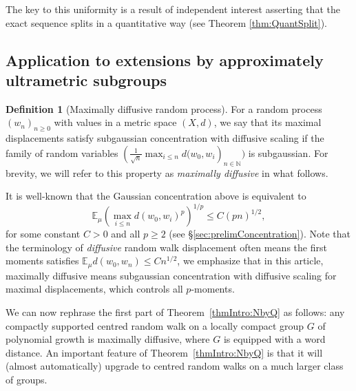 \documentclass[11pt,leqno]{article}
\theoremstyle{plain}
\theoremstyle{definition}
\newtheorem{definition}[theorem]{Definition}
\theoremstyle{remark}
\numberwithin{equation}{section}
\newcommand{\E}{\mathbb{E}}
\begin{document}
The key to this uniformity is a result of independent interest asserting that the exact sequence splits in a quantitative way (see Theorem \ref{thm:QuantSplit}). 

\subsection{Application to extensions by approximately ultrametric subgroups}

\begin{definition}[Maximally diffusive random process] 
For a random process $(w_{n})_{n\geq0}$ with values in a metric space
$(X,d)$, we say that its maximal displacements satisfy subgaussian concentration
with diffusive scaling if the family of random
variables $\left(\frac{1}{\sqrt{n}}\max_{i\leq n}d(w_{0},w_{i}\right)_{n\in \mathbb{N}})$ is subgaussian. For brevity, we will refer to this
property as \emph{maximally diffusive} in what follows. 
\end{definition}


It is well-known that the Gaussian
concentration above is equivalent to 
\[
\E_{\mu}\left(\max_{i\leq n}d(w_{0},w_{i})^{p}\right)^{1/p}\leq C(pn)^{1/2},
\]
for some constant $C>0$ and all $p\ge 2$ (see \S \ref{sec:prelimConcentration}).
Note that the terminology of \emph{diffusive} random walk displacement often
means the first moments satisfies $\E_{\mu}d(w_{0},w_{n})\leq Cn^{1/2}$,
we emphasize that in this article, maximally diffusive means subgaussian
concentration with diffusive scaling for maximal displacements, which
controls all $p$-moments.

We can now rephrase the first part of Theorem~\ref{thmIntro:NbyQ} as follows: any compactly
supported centred random walk on a locally compact group $G$ of
polynomial growth is maximally diffusive, where $G$ is equipped with
a word distance. An important feature of Theorem~\ref{thmIntro:NbyQ}
is that it will (almost automatically) upgrade to centred random walks on
a much larger class of groups. 


\end{document}
